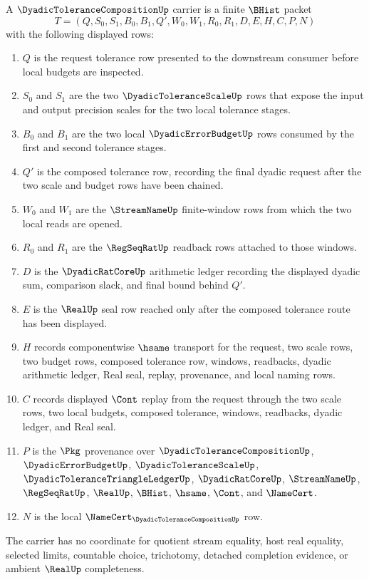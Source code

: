 \begin{definition}
\label{def:dyadic-tolerance-composition-carrier}
A $\DyadicToleranceCompositionUp$ carrier is a finite $\BHist$ packet
$$
T=(Q,S_0,S_1,B_0,B_1,Q',W_0,W_1,R_0,R_1,D,E,H,C,P,N)
$$
with the following displayed rows:
\begin{enumerate}
\item $Q$ is the request tolerance row presented to the downstream consumer before local budgets are inspected.
\item $S_0$ and $S_1$ are the two $\DyadicToleranceScaleUp$ rows that expose the input and output precision scales for the two local tolerance stages.
\item $B_0$ and $B_1$ are the two local $\DyadicErrorBudgetUp$ rows consumed by the first and second tolerance stages.
\item $Q'$ is the composed tolerance row, recording the final dyadic request after the two scale and budget rows have been chained.
\item $W_0$ and $W_1$ are the $\StreamNameUp$ finite-window rows from which the two local reads are opened.
\item $R_0$ and $R_1$ are the $\RegSeqRatUp$ readback rows attached to those windows.
\item $D$ is the $\DyadicRatCoreUp$ arithmetic ledger recording the displayed dyadic sum, comparison slack, and final bound behind $Q'$.
\item $E$ is the $\RealUp$ seal row reached only after the composed tolerance route has been displayed.
\item $H$ records componentwise $\hsame$ transport for the request, two scale rows, two budget rows, composed tolerance row, windows, readbacks, dyadic arithmetic ledger, Real seal, replay, provenance, and local naming rows.
\item $C$ records displayed $\Cont$ replay from the request through the two scale rows, two local budgets, composed tolerance, windows, readbacks, dyadic ledger, and Real seal.
\item $P$ is the $\Pkg$ provenance over $\DyadicToleranceCompositionUp$, $\DyadicErrorBudgetUp$, $\DyadicToleranceScaleUp$, $\DyadicToleranceTriangleLedgerUp$, $\DyadicRatCoreUp$, $\StreamNameUp$, $\RegSeqRatUp$, $\RealUp$, $\BHist$, $\hsame$, $\Cont$, and $\NameCert$.
\item $N$ is the local $\NameCert_{\DyadicToleranceCompositionUp}$ row.
\end{enumerate}
The carrier has no coordinate for quotient stream equality, host real equality, selected limits, countable choice, trichotomy, detached completion evidence, or ambient $\RealUp$ completeness.
\end{definition}

